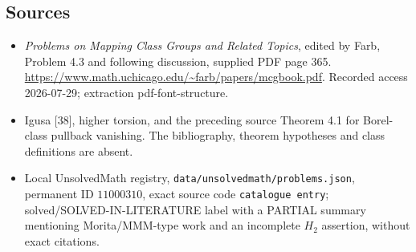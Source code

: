 \documentclass[11pt]{article}
\begin{document}
\subsection{Sources}
\begin{itemize}
\item \emph{Problems on Mapping Class Groups and Related Topics}, edited by Farb, Problem 4.3 and following discussion, supplied PDF page 365. \url{https://www.math.uchicago.edu/~farb/papers/mcgbook.pdf}. Recorded access 2026-07-29; extraction pdf-font-structure.
\item Igusa [38], higher torsion, and the preceding source Theorem 4.1 for Borel-class pullback vanishing. The bibliography, theorem hypotheses and class definitions are absent.
\item Local UnsolvedMath registry, \texttt{data/unsolvedmath/problems.json}, permanent ID \(11000310\), exact source code \texttt{catalogue entry}; solved/SOLVED-IN-LITERATURE label with a PARTIAL summary mentioning Morita/MMM-type work and an incomplete \(H_2\) assertion, without exact citations.
\end{itemize}
\end{document}
